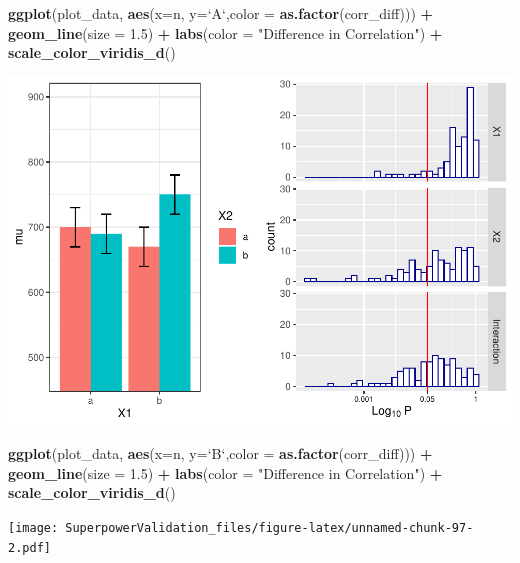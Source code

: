 \documentclass[]{book}
\newenvironment{Shaded}{\begin{snugshade}}{\end{snugshade}}
\newcommand{\DataTypeTok}[1]{\textcolor[rgb]{0.13,0.29,0.53}{#1}}
\newcommand{\FloatTok}[1]{\textcolor[rgb]{0.00,0.00,0.81}{#1}}
\newcommand{\KeywordTok}[1]{\textcolor[rgb]{0.13,0.29,0.53}{\textbf{#1}}}
\newcommand{\NormalTok}[1]{#1}
\newcommand{\OperatorTok}[1]{\textcolor[rgb]{0.81,0.36,0.00}{\textbf{#1}}}
\newcommand{\StringTok}[1]{\textcolor[rgb]{0.31,0.60,0.02}{#1}}
\begin{document}
\begin{Shaded}
\begin{Highlighting}[]
\KeywordTok{ggplot}\NormalTok{(plot_data, }\KeywordTok{aes}\NormalTok{(}\DataTypeTok{x=}\NormalTok{n, }\DataTypeTok{y=}\StringTok{`}\DataTypeTok{A}\StringTok{`}\NormalTok{,}\DataTypeTok{color =} \KeywordTok{as.factor}\NormalTok{(corr_diff))) }\OperatorTok{+}
\StringTok{  }\KeywordTok{geom_line}\NormalTok{(}\DataTypeTok{size =} \FloatTok{1.5}\NormalTok{) }\OperatorTok{+}
\StringTok{  }\KeywordTok{labs}\NormalTok{(}\DataTypeTok{color =} \StringTok{"Difference in Correlation"}\NormalTok{) }\OperatorTok{+}
\StringTok{  }\KeywordTok{scale_color_viridis_d}\NormalTok{()}
\end{Highlighting}
\end{Shaded}

\includegraphics{SuperpowerValidation_files/figure-latex/unnamed-chunk-97-1.pdf}

\begin{Shaded}
\begin{Highlighting}[]
\KeywordTok{ggplot}\NormalTok{(plot_data, }\KeywordTok{aes}\NormalTok{(}\DataTypeTok{x=}\NormalTok{n, }\DataTypeTok{y=}\StringTok{`}\DataTypeTok{B}\StringTok{`}\NormalTok{,}\DataTypeTok{color =} \KeywordTok{as.factor}\NormalTok{(corr_diff))) }\OperatorTok{+}
\StringTok{  }\KeywordTok{geom_line}\NormalTok{(}\DataTypeTok{size =} \FloatTok{1.5}\NormalTok{) }\OperatorTok{+}
\StringTok{  }\KeywordTok{labs}\NormalTok{(}\DataTypeTok{color =} \StringTok{"Difference in Correlation"}\NormalTok{) }\OperatorTok{+}
\StringTok{  }\KeywordTok{scale_color_viridis_d}\NormalTok{()}
\end{Highlighting}
\end{Shaded}

\texttt{[image: SuperpowerValidation\_files/figure-latex/unnamed-chunk-97-2.pdf]}
\end{document}
